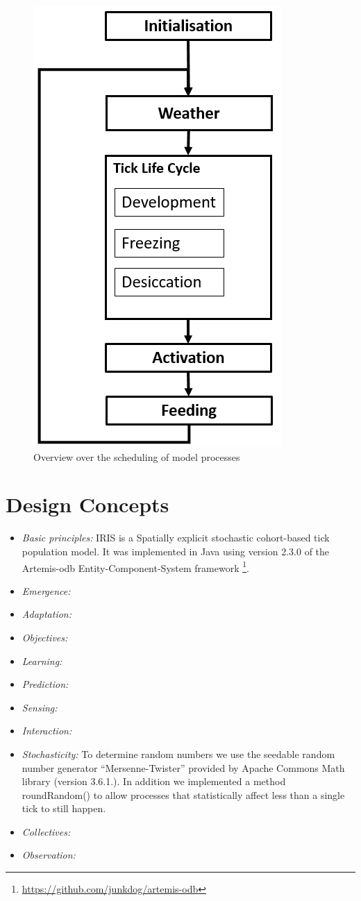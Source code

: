 \documentclass[a4paper, 11pt]{scrartcl}
\begin{document}
\begin{figure}[h!]
	\centering
	\includegraphics[width=0.3\linewidth]{figures/IRIS_scheduling.PNG}
	\caption{Overview over the scheduling of model processes}
	\label{fig:iris_scheduling}
\end{figure}

\newpage
\section{Design Concepts}\label{design_concepts}

\begin{itemize}

\item \emph{Basic principles:}
IRIS is a Spatially explicit stochastic cohort-based tick population model. It was implemented in Java using version 2.3.0 of the Artemis-odb Entity-Component-System framework \footnote{\url{https://github.com/junkdog/artemis-odb}}.

\item \emph{Emergence:}

\item \emph{Adaptation:}

\item \emph{Objectives:}

\item \emph{Learning:}

\item \emph{Prediction:}

\item \emph{Sensing:}

\item \emph{Interaction:}

\item \emph{Stochasticity:}
To determine random numbers we use the seedable random number generator ``Mersenne-Twister'' provided by Apache Commons Math library (version 3.6.1.). In addition we implemented a method roundRandom() to allow processes that statistically affect less than a single tick to still happen.

\item \emph{Collectives:}

\item \emph{Observation:}

\end{itemize}
\end{document}
